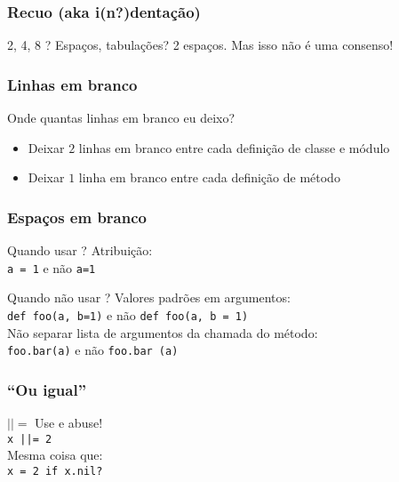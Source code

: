 \documentclass{beamer}
\begin{document}
\begin{frame}
    \frametitle{Recuo (aka i(n?)dentação)}
    \begin{block}{2, 4, 8 ? Espaços, tabulações?}
        2 espaços. Mas isso não é uma consenso!
    \end{block}
\end{frame}



\begin{frame}
    \frametitle{Linhas em branco}
    \begin{block}{Onde quantas linhas em branco eu deixo?}
        \begin{itemize}   
            \item Deixar $2$ linhas em branco entre cada definição de classe e módulo
            \item Deixar $1$ linha em branco entre cada definição de método
        \end{itemize}
    \end{block}
\end{frame}



\begin{frame}[fragile]
    \frametitle{Espaços em branco}
    \begin{block}{Quando usar ?}
        Atribuição:\\
        \verb#a = 1# e não \verb#a=1#
    \end{block}
    \begin{block}{Quando não usar ?}
        Valores padrões em argumentos:\\
        \verb#def foo(a, b=1)# e não \verb#def foo(a, b = 1)#\\
        Não separar lista de argumentos da chamada do método:\\
        \verb#foo.bar(a)# e não \verb#foo.bar (a)#
    \end{block}
\end{frame}


\begin{frame}[fragile]
    \frametitle{``Ou igual'' }
    \begin{block}{$||=$}
        Use e abuse!\\
        \verb#x ||= 2#\\
        Mesma coisa que:\\
        \verb#x = 2 if x.nil?#\\
    \end{block}
\end{frame}
\end{document}
